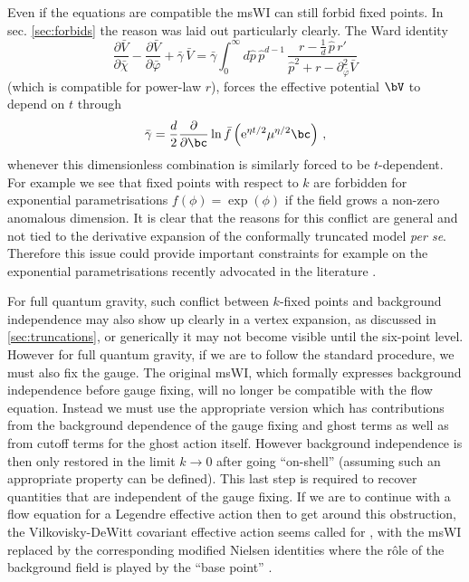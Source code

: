 \documentclass[11pt]{book} %
\newcommand{\be}{\begin{equation}}
\newcommand{\ee}{\end{equation}}
\begin{document}
Even if the equations are compatible the msWI can still forbid fixed points. In sec. \ref{sec:forbids} the reason was laid out particularly clearly. The Ward identity
\be 
\frac{\partial \bar V}{\partial \bar\chi} - \frac{\partial \bar V}{\partial \bar\varphi} + \bar \gamma \, \bar V = \bar \gamma
\int_0^{\infty} d\hat p \, \hat p^{d-1} \, \frac{r - \frac{1}{d} \, \hat p \, r'}{\hat p^2 + r - \partial^2_{\bar\varphi}\bar V} 
\ee
(which is compatible for power-law $r$),
forces the effective potential $\bV$ to depend on $t$ through
\be 
\bar{\gamma} = \frac{d}{2}\frac{\partial}{\partial\bc}\ln\bar{f}\left({\rm e}^{\eta t/2}\mu^{\eta/2}\bc\right)\,,
\ee
whenever this dimensionless combination is similarly forced to be $t$-dependent. For example  we see that fixed points with respect to $k$ are forbidden for exponential parametrisations $f(\phi)= \exp(\phi)$  if the field grows a non-zero anomalous dimension.  It is clear that the reasons for this conflict are general and not tied to the derivative expansion of the conformally truncated model \textit{per se}. Therefore this issue could provide important constraints for example on the exponential parametrisations recently advocated in the literature \cite{Demmel:2015zfa,Eichhorn:2013xr,Eichhorn:2015bna,Nink:2014yya,Percacci:2015wwa,Labus:2015ska,Ohta:2015efa,Gies:2015tca,Dona:2015tnf}.

For full quantum gravity, such conflict between $k$-fixed points and background independence may also show up clearly in a vertex expansion, as discussed in \ref{sec:truncations}, or generically it may not become visible until the six-point level. However for full quantum gravity, if we are to follow the standard procedure, we must also fix the gauge. The original msWI, which formally expresses background independence before gauge fixing, will no longer be compatible with the flow equation. Instead we must use the appropriate version which has  contributions from the background dependence of the gauge fixing and ghost terms as well as from cutoff terms for the ghost action itself. However background independence is then only restored in the limit $k\to0$ after going ``on-shell'' (assuming such an appropriate property can be defined). This last step is required to recover quantities that are independent of the gauge fixing. If we are to continue with a flow equation for a Legendre effective action \cite{Wetterich:1992,Morris:1993} then to get around this obstruction, the Vilkovisky-DeWitt covariant effective action seems called for \cite{Branchina:2003ek,Donkin:2012ud,Demmel:2014hla,Safari:2015dva}, with the msWI replaced by the corresponding modified Nielsen identities where the r\^ole of the background field is played by the ``base point'' \cite{Pawlowski:2003sk}.
\end{document}
